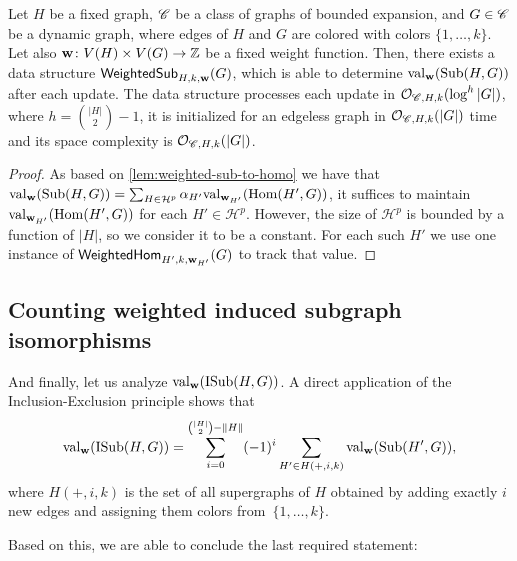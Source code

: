 \begin{lemma}
	Let $H$ be a fixed graph, $\mathscr C$ be a class of graphs of bounded expansion, and $G\in \mathscr C$ be a dynamic graph, where edges of $H$ and $G$ are colored with colors $\{1, \ldots, k\}$. Let also $\mathbf{w} \colon V(H) \times V(G) \to \mathbb{Z}$ be a fixed weight function. Then, there exists a data structure $\mathsf{WeightedSub}_{H, k, \mathbf{w}}(G)$, which is able to determine $\mathrm{val}_{\mathbf{w}}(\mathrm{Sub}(H, G))$ after each update. %
	The data structure processes each update in $\mathcal{O}_{\mathscr C, H, k}(\log^h |G|)$, where $h = {|H| \choose 2} - 1$, it is initialized for an edgeless graph in $\mathcal{O}_{\mathscr C, H, k}(|G|)$ time and its space complexity is $\mathcal{O}_{\mathscr C, H, k}(|G|)$.%
\end{lemma}

\begin{proof}
As based on \cref{lem:weighted-sub-to-homo} we have that
$\mathrm{val}_{\mathbf{w}}(\mathrm{Sub}(H, G)) = \sum_{H \in \mathcal{H}^p} \alpha_{H'} \mathrm{val}_{\mathbf{w}_{H'}}(\mathrm{Hom}(H', G))$,
it suffices to maintain $\mathrm{val}_{\mathbf{w}_{H'}}(\mathrm{Hom}(H', G))$ for each $H' \in \mathcal{H}^p$. However, the size of $\mathcal{H}^p$
is bounded by a function of $|H|$, so we consider it to be a constant. For each such $H'$ we use one instance of $\mathsf{WeightedHom}_{H', k, \mathbf{w}_{H'}}(G)$ to track that value.
\end{proof}

\subsection{Counting weighted induced subgraph isomorphisms}
And finally, let us analyze $\mathrm{val}_{\mathbf{w}}(\mathrm{ISub}(H, G))$. 
A direct application of the Inclusion-Exclusion principle shows that \[\mathrm{val}_{\mathbf{w}}(\mathrm{ISub}(H, G)) = \sum_{i=0}^{{|H| \choose 2} - \|H\|} (-1)^i \sum_{H' \in H(+, i, k)} \mathrm{val}_{\mathbf{w}}(\mathrm{Sub}(H', G)),\] where $H(+, i, k)$ is the set of all supergraphs of $H$ obtained by adding exactly $i$ new edges and assigning them colors from~$\{1, \ldots, k\}$.

Based on this, we are able to conclude the last required statement:

